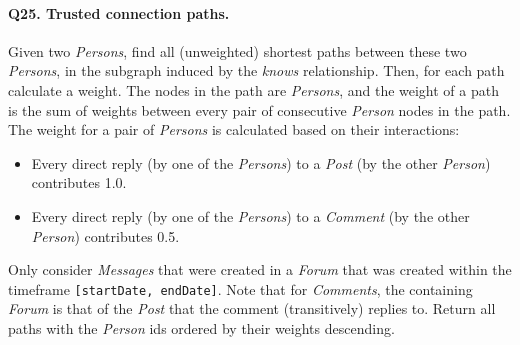 \paragraph{\textbf{Q25}. Trusted connection paths.}
Given two \emph{Persons}, find all (unweighted) shortest paths between
these two \emph{Persons}, in the subgraph induced by the \emph{knows}
relationship.
Then, for each path calculate a weight. The nodes in the path are
\emph{Persons}, and the weight of a path is the sum of weights between
every pair of consecutive \emph{Person} nodes in the path.
The weight for a pair of \emph{Persons} is calculated based on their
interactions:
\begin{itemize}
\tightlist
\item
  Every direct reply (by one of the \emph{Persons}) to a \emph{Post} (by
  the other \emph{Person}) contributes 1.0.
\item
  Every direct reply (by one of the \emph{Persons}) to a \emph{Comment}
  (by the other \emph{Person}) contributes 0.5.
\end{itemize}
Only consider \emph{Messages} that were created in a \emph{Forum} that
was created within the timeframe \texttt{{[}startDate,\ endDate{]}}.
Note that for \emph{Comments}, the containing \emph{Forum} is that of
the \emph{Post} that the comment (transitively) replies to.
Return all paths with the \emph{Person} ids ordered by their weights
descending.
